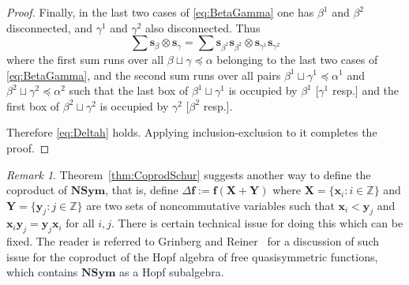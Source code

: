 \documentclass{amsart}
\newtheorem*{Young's Rule}{Young's Rule}
\theoremstyle{definition}
\theoremstyle{remark}
\newtheorem{remark}[theorem]{Remark}
\numberwithin{equation}{section}
\begin{document}
\begin{proof}
Finally, in the last two cases of \eqref{eq:BetaGamma} one has $\beta^1$ and $\beta^2$  disconnected, and $\gamma^1$ and $\gamma^2$ also disconnected. Thus
\[
\sum {{\mathbf s}}_\beta\otimes{{\mathbf s}}_\gamma =  \sum {{\mathbf s}}_{\beta^1}{{\mathbf s}}_{\beta^2} \otimes {{\mathbf s}}_{\gamma^1}{{\mathbf s}}_{\gamma^2}
\]
where the first sum runs over all $\beta\sqcup\gamma{\operatorname{\preccurlyeq}}\alpha$ belonging to the last two cases of \eqref{eq:BetaGamma}, and the second sum runs over all pairs $\beta^1\sqcup\gamma^1{\operatorname{\preccurlyeq}}\alpha^1$ and $\beta^2\sqcup\gamma^2{\operatorname{\preccurlyeq}}\alpha^2$ such that the last box of $\beta^1\sqcup\gamma^1$ is occupied by $\beta^1$ [$\gamma^1$ resp.] and the first box of $\beta^2\sqcup\gamma^2$ is occupied by $\gamma^2$ $[\beta^2$ resp.].

Therefore \eqref{eq:Deltah} holds. Applying inclusion-exclusion to it  completes the proof.
\end{proof}

\begin{remark}
Theorem~\ref{thm:CoprodSchur} suggests another way to define the coproduct of ${\mathbf{NSym}}$, that is, define $\Delta \mathbf{f} := \mathbf{f}(\mathbf X+\mathbf Y)$ where $\mathbf X=\{{{\mathbf x}}_i:i\in{{\mathbb Z}}\}$ and $\mathbf Y=\{\mathbf y_j:j\in{{\mathbb Z}}\}$ are two sets of noncommutative variables such that ${{\mathbf x}}_i<\mathbf y_j$ and ${{\mathbf x}}_i\mathbf y_j=\mathbf y_j{{\mathbf x}}_i$ for all $i,j$. There is certain technical issue for doing this which can be fixed. The reader is referred to Grinberg and Reiner~\cite[\S7.1]{GrinbergReiner} for a discussion of such issue for the coproduct of the Hopf algebra of free quasisymmetric functions, which contains ${\mathbf{NSym}}$ as a Hopf subalgebra.
\end{remark}

 
 
\end{document}
